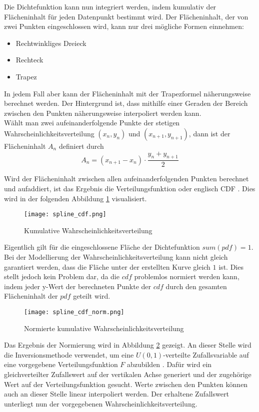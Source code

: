 Die Dichtefunktion kann nun integriert werden, indem kumulativ der Flächeninhalt für jeden Datenpunkt bestimmt wird. Der Flächeninhalt, der von zwei Punkten eingeschlossen wird, kann nur drei mögliche Formen einnehmen:
\begin{itemize}
    \item Rechtwinkliges Dreieck
    \item Rechteck
    \item Trapez
\end{itemize}
In jedem Fall aber kann der Flächeninhalt mit der Trapezformel näherungsweise berechnet werden. Der Hintergrund ist, dass mithilfe einer Geraden der Bereich zwischen den Punkten näherungsweise interpoliert werden kann.\\
Wählt man zwei aufeinanderfolgende Punkte der stetigen Wahrscheinlichkeitsverteilung $(x_n,y_n)$ und $(x_{n+1},y_{n+1})$, dann ist der Flächeninhalt $A_n$ definiert durch
$$A_n=(x_{n+1}-x_n) \cdot \frac{y_n+y_{n+1}}{2}$$

Wird der Flächeninhalt zwischen allen aufeinanderfolgenden Punkten berechnet und aufaddiert, ist das Ergebnis die Verteilungsfunktion oder englisch \ac{CDF} \cite{denker:2008}. Dies wird in der folgenden Abbildung \ref{fig:cdf} visualisiert.

\begin{figure}[H]
    \centering
    \texttt{[image: spline\_cdf.png]}
    \caption{Kumulative Wahrscheinlichkeitsverteilung}\label{fig:cdf}
\end{figure}

Eigentlich gilt für die eingeschlossene Fläche der Dichtefunktion $sum(pdf)=1$. Bei der Modellierung der Wahrscheinlichkeitsverteilung kann nicht gleich garantiert werden, dass die Fläche unter der erstellten Kurve gleich $1$ ist. Dies stellt jedoch kein Problem dar, da die $cdf$ problemlos normiert werden kann, indem jeder y-Wert der berechneten Punkte der $cdf$ durch den gesamten Flächeninhalt der $pdf$ geteilt wird.

\begin{figure}[H]
    \centering
    \texttt{[image: spline\_cdf\_norm.png]}
    \caption{Normierte kumulative Wahrscheinlichkeitsverteilung}\label{fig:cdfnorm}
\end{figure}

Das Ergebnis der Normierung wird in Abbildung \ref{fig:cdfnorm} gezeigt.
An dieser Stelle wird die Inversionsmethode verwendet, um eine $U(0,1)$-verteilte Zufallsvariable auf eine vorgegebene Verteilungsfunktion $F$ abzubilden \cite{Inversionsmethode}. Dafür wird ein gleichverteilter Zufallswert auf der vertikalen Achse generiert und der zugehörige Wert auf der Verteilungsfunktion gesucht. Werte zwischen den Punkten können auch an dieser Stelle linear interpoliert werden. Der erhaltene Zufallswert unterliegt nun der vorgegebenen Wahrscheinlichkeitsverteilung.

